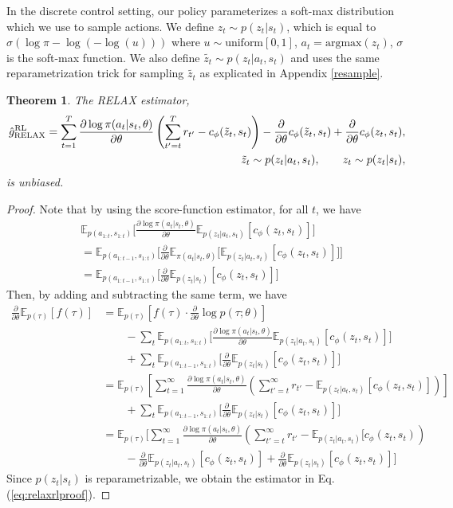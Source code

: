 \documentclass{article}
\newcommand{\E}{\mathbb{E}}
\newcommand{\LL}[1]{\frac{\partial \log \pi(a_{#1}| s_{#1}, \theta)}{\partial \theta}}
\newcommand{\PT}{\frac{\partial}{\partial \theta}}
\newcommand{\LP}[1]{\PT \log p(#1)}
\newcommand{\RL}{{\textnormal{RL}}}
\newcommand{\RELAX}{{\textnormal{RELAX}}}
\newtheorem{theorem}{Theorem}[section]
\begin{document}
In the discrete control setting, our policy parameterizes a soft-max distribution which we use to sample actions. We define $z_t\sim p(z_t|s_t)$, which is equal to $\sigma (\log\pi - \log(-\log(u)))$ where $u\sim \text{uniform}[0, 1]$, $a_t = \text{argmax}(z_t)$, $\sigma$ is the soft-max function. We also define $\tilde{z_t} \sim p(z_t|a_t,s_t)$ and uses the same reparametrization trick for sampling $\tilde{z_t}$ as explicated in Appendix \ref{resample}.
\begin{theorem}
The \RELAX{} estimator,
\begin{align}
\hat g_\RELAX^{\RL} = \sum_{t=1}^{T} \LL{t}\left(\sum_{t'=t}^{T} r_{t'} - c_\phi(\tilde{z}_t, s_t)\right)-\frac{\partial}{\partial\theta}c_\phi(\tilde{z}_t, s_t)+\frac{\partial}{\partial\theta}c_\phi(z_t, s_t), \label{eq:relaxrlproof}\\
\tilde{z}_t \sim p(z_t|a_t,s_t), \qquad z_t \sim p(z_t|s_t)\nonumber, 
\end{align}
is unbiased.
\end{theorem}
\begin{proof}
Note that by using the score-function estimator, for all $t$, we have 
%
\begin{align*}
& \E_{p(a_{1:t},s_{1:t})}\Big[\LL{t} \E_{p(z_t|a_t,s_t)}[c_\phi(z_t, s_t)]\Big]\\
 &= \E_{p(a_{1:t-1},s_{1:t})}\Big[\frac{\partial}{\partial\theta}\E_{\pi(a_t|s_t, \theta)}\Big[\E_{p(z_t|a_t,s_t)}[c_\phi(z_t, s_t)]\Big]\Big]\\
&=\E_{p(a_{1:t-1},s_{1:t})}\Big[\frac{\partial}{\partial\theta}\E_{p(z_t|s_t)}[c_\phi(z_t, s_t)]\Big]
\end{align*}
Then, by adding and subtracting the same term, we have
\begin{align*}
\PT\E_{p(\tau)}[f(\tau)] &= \E_{p(\tau)}\left[f(\tau)\cdot\LP{\tau;\theta}\right]\\
& \qquad -\sum_t\E_{p(a_{1:t},s_{1:t})}\Big[\LL{t} \E_{p(z_t|a_t,s_t)}[c_\phi(z_t, s_t)]\Big]\\
& \qquad + \sum_t\E_{p(a_{1:t-1},s_{1:t})}\Big[\frac{\partial}{\partial\theta}\E_{p(z_t|s_t)}[c_\phi(z_t, s_t)]\Big]\nonumber\\
& = \E_{p(\tau)}\left[ \sum_{t=1}^{\infty} \LL{t}\left(\sum_{t'=t}^{\infty} r_{t'} - \E_{p(z_t|a_t,s_t)}[c_\phi(z_t, s_t)]\right)\right]\\
& \qquad + \sum_t\E_{p(a_{1:t-1},s_{1:t})}\Big[\frac{\partial}{\partial\theta}\E_{p(z_t|s_t)}[c_\phi(z_t, s_t)]\Big]\nonumber\\
& = \E_{p(\tau)}\Big[ \sum_{t=1}^{\infty} \LL{t}\left(\sum_{t'=t}^{\infty} r_{t'} - \E_{p(z_t|a_t,s_t)}[c_\phi(z_t, s_t)\right)\\
& \qquad - \frac{\partial}{\partial\theta}\E_{p(z_t|a_t,s_t)}[c_\phi(z_t, s_t)]+\frac{\partial}{\partial\theta}\E_{p(z_t|s_t)}[c_\phi(z_t, s_t)]\Big]\nonumber
\end{align*}
Since $p(z_t|s_t)$ is reparametrizable, we obtain the estimator in Eq.(\ref{eq:relaxrlproof}).
\end{proof}
\end{document}
